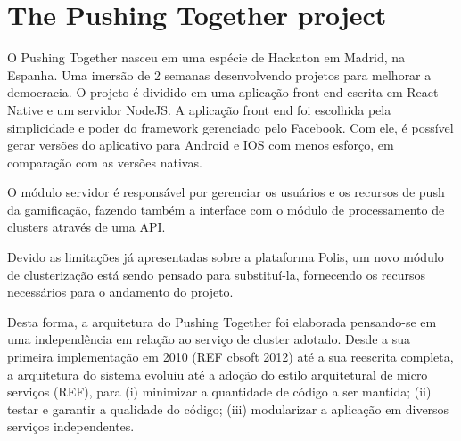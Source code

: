 \documentclass{llncs}
\begin{document}
%

\section{The Pushing Together project}
\label{sec:mezuro}

O Pushing Together nasceu em uma espécie de Hackaton em Madrid, na Espanha. Uma
imersão de 2 semanas desenvolvendo projetos para melhorar a democracia. O projeto 
é dividido em uma aplicação front end escrita em React Native e um servidor NodeJS.
A aplicação front end foi escolhida pela simplicidade e poder do framework gerenciado
pelo Facebook. Com ele, é possível gerar versões do aplicativo para Android e IOS com menos esforço, em comparação com
as versões nativas.

O módulo servidor é responsável por gerenciar os usuários e os
recursos de push da gamificação, fazendo também a interface com o módulo
de processamento de clusters através de uma API.

Devido as limitações já apresentadas sobre a plataforma Polis, um novo módulo de
clusterização está sendo pensado para substituí-la, fornecendo os recursos
necessários para o andamento do projeto.

Desta forma,  a arquitetura do Pushing Together foi elaborada pensando-se
em uma independência em relação ao serviço de cluster adotado.
Desde a sua primeira implementação em 2010 (REF cbsoft 2012) até a sua
reescrita completa, a arquitetura do sistema evoluiu até a adoção do estilo
arquitetural de micro serviços (REF), para  (i) minimizar a quantidade de
código a ser mantida; (ii) testar e garantir a qualidade do código; (iii)
modularizar a aplicação em diversos serviços independentes.
\end{document}
